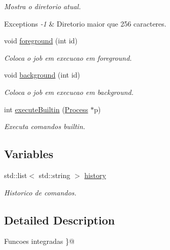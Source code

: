 \begin{DoxyCompactItemize}
\begin{DoxyCompactList}\small\item\em Mostra o diretorio atual. 
\begin{DoxyExceptions}{Exceptions}
{\em -\/1} & Diretorio maior que 256 caracteres. \\
\hline
\end{DoxyExceptions}
\end{DoxyCompactList}\item 
void \hyperlink{group__Builtin_gac001b748ccd4d93fdf0359655bfc13f2}{foreground} (int id)
\begin{DoxyCompactList}\small\item\em Coloca o job em execucao em foreground. \end{DoxyCompactList}\item 
void \hyperlink{group__Builtin_gaba0faeb21dd37ec84f38fbc4033224f3}{background} (int id)
\begin{DoxyCompactList}\small\item\em Coloca o job em execucao em background. \end{DoxyCompactList}\item 
int \hyperlink{group__Builtin_ga6621cfda0e336a7d1526736d602b203c}{executeBuiltin} (\hyperlink{classProcess}{Process} $\ast$p)
\begin{DoxyCompactList}\small\item\em Executa comandos builtin. \end{DoxyCompactList}\end{DoxyCompactItemize}
\subsection*{Variables}
\begin{DoxyCompactItemize}
\item 
\hypertarget{group__Builtin_ga0683b6bca056b22291107ea1b8b9220f}{
std::list$<$ std::string $>$ \hyperlink{group__Builtin_ga0683b6bca056b22291107ea1b8b9220f}{history}}
\label{group__Builtin_ga0683b6bca056b22291107ea1b8b9220f}

\begin{DoxyCompactList}\small\item\em Historico de comandos. \end{DoxyCompactList}\end{DoxyCompactItemize}


\subsection{Detailed Description}
Funcoes integradas \}@ 

